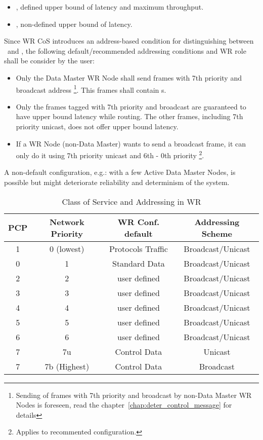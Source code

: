 \begin{itemize}
	\item \HP, defined upper bound of latency and maximum throughput.
	\item \SP, non-defined upper bound of latency.
\end{itemize}

Since WR CoS introduces an address-based condition for distinguishing between
\HP\ and \SP, the following default/recommended addressing conditions and WR
role shall be consider by the user:

\begin{itemize}
	\item Only the Data Master WR Node shall send frames with 7th priority
	      and broadcast address \footnote{Sending of frames with 7th
	      priority and broadcast by non-Data Master WR Nodes is foreseen,
	      read the chapter~\ref{chap:deter_control_message} for details}.
	      This frames shall contain \ControlMessage s.
	\item Only the frames tagged with 7th priority and
	      broadcast are guaranteed to have upper bound latency while
	      routing. The other frames, including 7th priority unicast, does
	      not offer upper bound latency.
	\item If a WR Node (non-Data Master) wants to send a broadcast frame, it
	      can only do it using 7th priority unicast and 6th - 0th priority	
	      \footnote{Applies to recommented configuration.}.
\end{itemize}


 
A non-default configuration, e.g.: with a few Active Data Master Nodes, is
possible but might deteriorate reliability and determinism of the system.


\begin{table}[!ht]
\begin{center}
\begin{tabular}{|c|c|c|c|}
\hline
\textbf{PCP} & \textbf{Network Priority} & \textbf{WR Conf. default} &
\textbf{Addressing Scheme} \\ \hline
1 & 0 (lowest) &  Protocols Traffic & Broadcast/Unicast \\  \hline
0 & 1 & Standard Data & Broadcast/Unicast  \\  \hline
2 & 2 &  user defined & Broadcast/Unicast \\  \hline
3 & 3 & user defined & Broadcast/Unicast \\  \hline
4 & 4 & user defined & Broadcast/Unicast \\  \hline
5 & 5 &  user defined& Broadcast/Unicast \\  \hline
6 & 6 & user defined & Broadcast/Unicast \\  \hline
7 & 7u & Control Data & Unicast  \\  \hline
7 & 7b (Highest) & Control Data & Broadcast \\  \hline
\end{tabular}
\caption{Class of Service and Addressing in WR}
\label{tab:CoS}
\end{center}
\end{table}


